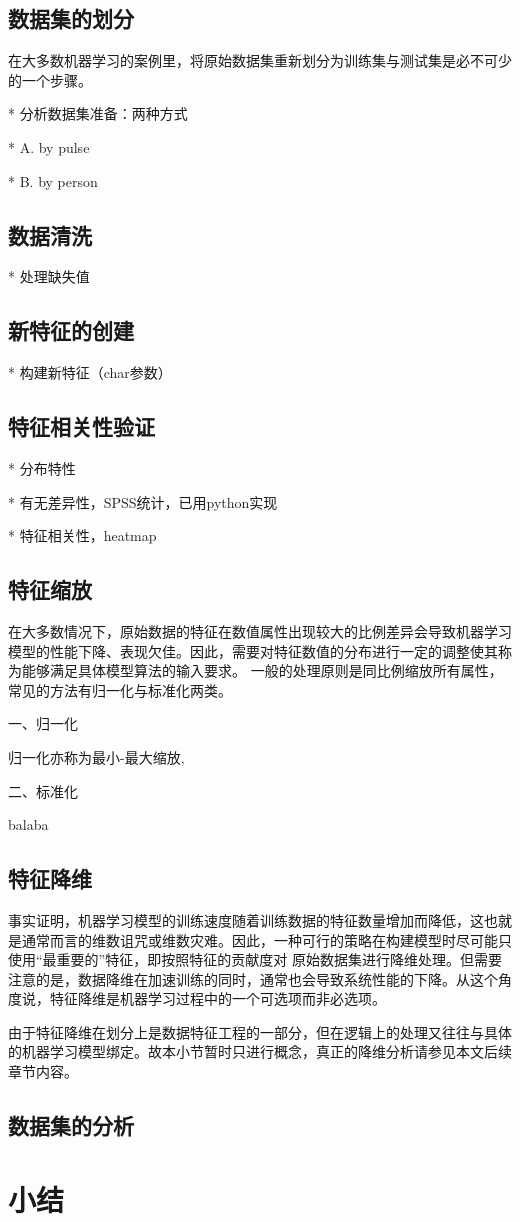 \subsection{数据集的划分}
在大多数机器学习的案例里，将原始数据集重新划分为训练集与测试集是必不可少的一个步骤。

* 分析数据集准备：两种方式

  * A. by pulse

  * B. by person

\subsection{数据清洗}
* 处理缺失值

\subsection{新特征的创建}
* 构建新特征（char参数）
\subsection{特征相关性验证}
* 分布特性

  * 有无差异性，SPSS统计，已用python实现

  * 特征相关性，heatmap
\subsection{特征缩放}
在大多数情况下，原始数据的特征在数值属性出现较大的比例差异会导致机器学习模型的性能下降、表现欠佳\cite{Aurélien2018}。因此，需要对特征数值的分布进行一定的调整使其称为能够满足具体模型算法的输入要求。
一般的处理原则是同比例缩放所有属性，常见的方法有归一化与标准化两类。

一、归一化

归一化亦称为最小-最大缩放,

二、标准化

balaba
\subsection{特征降维}
事实证明，机器学习模型的训练速度随着训练数据的特征数量增加而降低，这也就是通常而言的维数诅咒或维数灾难。因此，一种可行的策略在构建模型时尽可能只使用“最重要的”特征，即按照特征的贡献度对
原始数据集进行降维处理。但需要注意的是，数据降维在加速训练的同时，通常也会导致系统性能的下降。从这个角度说，特征降维是机器学习过程中的一个可选项而非必选项。

由于特征降维在划分上是数据特征工程的一部分，但在逻辑上的处理又往往与具体的机器学习模型绑定。故本小节暂时只进行概念，真正的降维分析请参见本文后续章节内容。
\subsection{数据集的分析}
\section{小结}